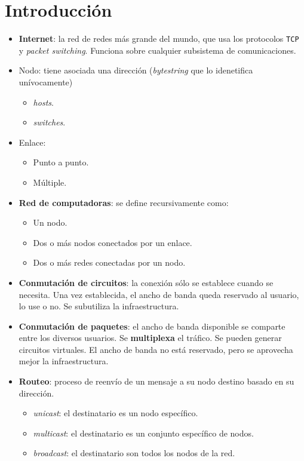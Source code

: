 \documentclass[]{article}
\begin{document}
\section{Introducción}
\begin{itemize}
	\item \textbf{Internet}: la red de redes más grande del mundo, que usa los protocolos \texttt{TCP} y \emph{packet switching}. Funciona sobre cualquier subsistema de comunicaciones.
	\item Nodo: tiene asociada una dirección (\emph{bytestring} que lo idenetifica unívocamente)
	\begin{itemize}
		\item \emph{hosts}.
		\item \emph{switches}.
	\end{itemize}
	\item Enlace:
	\begin{itemize}
		\item Punto a punto.
		\item Múltiple.
	\end{itemize}
	\item \textbf{Red de computadoras}: se define recursivamente como:
	\begin{itemize}
		\item Un nodo.
		\item Dos o más nodos conectados por un enlace.
		\item Dos o más redes conectadas por un nodo.
	\end{itemize}
	\item \textbf{Conmutación de circuitos}: la conexión sólo se establece cuando se necesita. Una vez establecida, el ancho de banda queda reservado al usuario, lo use o no. Se subutiliza la infraestructura.
	\item \textbf{Conmutación de paquetes}: el ancho de banda disponible se comparte entre los diversos usuarios. Se \textbf{multiplexa} el tráfico. Se pueden generar circuitos virtuales. El ancho de banda no está reservado, pero se aprovecha mejor la infraestructura.
	\item \textbf{Routeo}: proceso de reenvío de un mensaje a su nodo destino basado en su dirección.
	\begin{itemize}
		\item \emph{unicast}: el destinatario es un nodo específico.
		\item \emph{multicast}: el destinatario es un conjunto específico de nodos.
		\item \emph{broadcast}: el destinatario son todos los nodos de la red.

\end{itemize}
\end{itemize}
\end{document}
